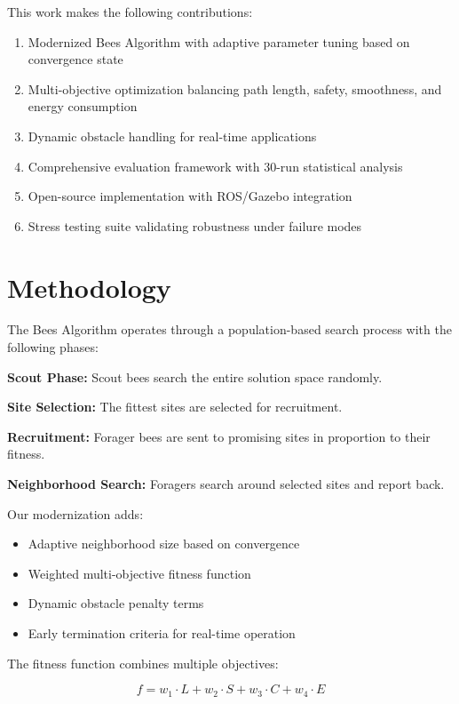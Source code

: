 \documentclass[12pt]{article}
\begin{document}
This work makes the following contributions:

\begin{enumerate}
    \item Modernized Bees Algorithm with adaptive parameter tuning based on convergence state
    \item Multi-objective optimization balancing path length, safety, smoothness, and energy consumption
    \item Dynamic obstacle handling for real-time applications
    \item Comprehensive evaluation framework with 30-run statistical analysis
    \item Open-source implementation with ROS/Gazebo integration
    \item Stress testing suite validating robustness under failure modes
\end{enumerate}

\section{Methodology}

The Bees Algorithm operates through a population-based search process with the following phases:

\textbf{Scout Phase:} Scout bees search the entire solution space randomly.

\textbf{Site Selection:} The fittest sites are selected for recruitment.

\textbf{Recruitment:} Forager bees are sent to promising sites in proportion to their fitness.

\textbf{Neighborhood Search:} Foragers search around selected sites and report back.

Our modernization adds:

\begin{itemize}
    \item Adaptive neighborhood size based on convergence
    \item Weighted multi-objective fitness function
    \item Dynamic obstacle penalty terms
    \item Early termination criteria for real-time operation
\end{itemize}

The fitness function combines multiple objectives:

\begin{equation}
    f = w_1 \cdot L + w_2 \cdot S + w_3 \cdot C + w_4 \cdot E
\end{equation}
\end{document}
